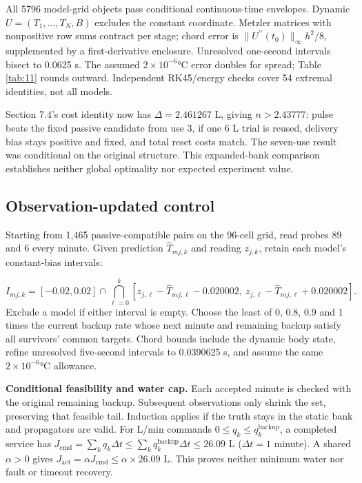 \documentclass[12pt,a4paper]{article}
\begin{document}
All 5796 model-grid objects pass conditional continuous-time envelopes. Dynamic $U=(T_1,\ldots,T_N,B)$ excludes the constant coordinate. Metzler matrices with nonpositive row sums contract per stage; chord error is $\|U^{\prime\prime}(t_0)\|_\infty h^2/8$, supplemented by a first-derivative enclosure. Unresolved one-second intervals bisect to 0.0625 s. The assumed $2\times10^{-6}$°C error doubles for spread; Table \ref{tab:11} rounds outward. Independent RK45/energy checks cover 54 extremal identities, not all models.

Section 7.4’s cost identity now has $\Delta=2.461267$ L, giving $n>2.43777$: pulse beats the fixed passive candidate from use 3, if one 6 L trial is reused, delivery bias stays positive and fixed, and total reset costs match. The seven-use result was conditional on the original structure. This expanded-bank comparison establishes neither global optimality nor expected experiment value.

\subsection{Observation-updated control}
Starting from 1,465 passive-compatible pairs on the 96-cell grid, read probes 89 and 6 every minute. Given prediction $\widehat T_{mj,k}$ and reading $z_{j,k}$, retain each model’s constant-bias intervals:

\begin{equation}I_{mj,k}=[-0.02,0.02]\cap\bigcap_{\ell=0}^{k}[z_{j,\ell}-\widehat T_{mj,\ell}-0.020002,\ z_{j,\ell}-\widehat T_{mj,\ell}+0.020002].\end{equation}
Exclude a model if either interval is empty. Choose the least of 0, 0.8, 0.9 and 1 times the current backup rate whose next minute and remaining backup satisfy all survivors’ common targets. Chord bounds include the dynamic body state, refine unresolved five-second intervals to 0.0390625 s, and assume the same $2\times10^{-6}$°C allowance.

\textbf{Conditional feasibility and water cap.} Each accepted minute is checked with the original remaining backup. Subsequent observations only shrink the set, preserving that feasible tail. Induction applies if the truth stays in the static bank and propagators are valid. For L/min commands $0\le q_k\le q_k^{\mathrm{backup}}$, a completed service has $J_{\mathrm{cmd}}=\sum_k q_k\Delta t\le\sum_k q_k^{\mathrm{backup}}\Delta t\le26.09$ L ($\Delta t=1$ minute). A shared $\alpha>0$ gives $J_{\mathrm{act}}=\alpha J_{\mathrm{cmd}}\le\alpha\times26.09$ L. This proves neither minimum water nor fault or timeout recovery.
\end{document}
